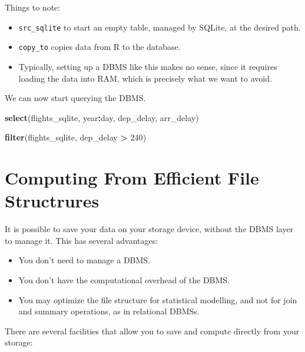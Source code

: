 \documentclass[]{book}
\newenvironment{Shaded}{\begin{snugshade}}{\end{snugshade}}
\newcommand{\DecValTok}[1]{\textcolor[rgb]{0.00,0.00,0.81}{#1}}
\newcommand{\KeywordTok}[1]{\textcolor[rgb]{0.13,0.29,0.53}{\textbf{#1}}}
\newcommand{\NormalTok}[1]{#1}
\newcommand{\OperatorTok}[1]{\textcolor[rgb]{0.81,0.36,0.00}{\textbf{#1}}}
\newcommand{\StringTok}[1]{\textcolor[rgb]{0.31,0.60,0.02}{#1}}
\providecommand{\tightlist}{%
  \setlength{\itemsep}{0pt}\setlength{\parskip}{0pt}}
\theoremstyle{definition}
\theoremstyle{definition}
\theoremstyle{definition}
\theoremstyle{remark}
\begin{document}
Things to note:

\begin{itemize}
\tightlist
\item
  \texttt{src\_sqlite} to start an empty table, managed by SQLite, at the desired path.
\item
  \texttt{copy\_to} copies data from R to the database.
\item
  Typically, setting up a DBMS like this makes no sense, since it requires loading the data into RAM, which is precisely what we want to avoid.
\end{itemize}

We can now start querying the DBMS.

\begin{Shaded}
\begin{Highlighting}[]
\KeywordTok{select}\NormalTok{(flights_sqlite, year}\OperatorTok{:}\NormalTok{day, dep_delay, arr_delay)}
\end{Highlighting}
\end{Shaded}

\begin{Shaded}
\begin{Highlighting}[]
\KeywordTok{filter}\NormalTok{(flights_sqlite, dep_delay }\OperatorTok{>}\StringTok{ }\DecValTok{240}\NormalTok{)}
\end{Highlighting}
\end{Shaded}

\hypertarget{file-structure}{%
\section{Computing From Efficient File Structrures}\label{file-structure}}

It is possible to save your data on your storage device, without the DBMS layer to manage it.
This has several advantages:

\begin{itemize}
\tightlist
\item
  You don't need to manage a DBMS.
\item
  You don't have the computational overhead of the DBMS.
\item
  You may optimize the file structure for statistical modelling, and not for join and summary operations, as in relational DBMSs.
\end{itemize}

There are several facilities that allow you to save and compute directly from your storage:
\end{document}
